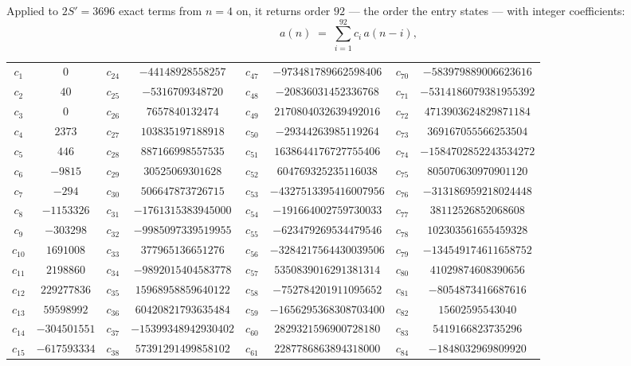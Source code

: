 \documentclass[11pt,a4paper]{article}
\theoremstyle{plain}
\theoremstyle{definition}
\begin{document}
Applied to $2S'=3696$ exact terms from $n=4$ on, it returns order $92$ --- the
order the entry states --- with integer coefficients:
\[
a(n)\;=\;\sum_{i=1}^{92}c_i\,a(n-i),
\]
\begin{center}\small
\begin{tabular}{cccccccc}
$c_{1}$ & $0$ & $c_{24}$ & $-44148928558257$ & $c_{47}$ & $-973481789662598406$ & $c_{70}$ & $-583979889006623616$ \\
$c_{2}$ & $40$ & $c_{25}$ & $-5316709348720$ & $c_{48}$ & $-20836031452336768$ & $c_{71}$ & $-5314186079381955392$ \\
$c_{3}$ & $0$ & $c_{26}$ & $7657840132474$ & $c_{49}$ & $2170804032639492016$ & $c_{72}$ & $4713903624829871184$ \\
$c_{4}$ & $2373$ & $c_{27}$ & $103835197188918$ & $c_{50}$ & $-29344263985119264$ & $c_{73}$ & $369167055566253504$ \\
$c_{5}$ & $446$ & $c_{28}$ & $887166998557535$ & $c_{51}$ & $1638644176727755406$ & $c_{74}$ & $-1584702852243534272$ \\
$c_{6}$ & $-9815$ & $c_{29}$ & $30525069301628$ & $c_{52}$ & $604769325235116038$ & $c_{75}$ & $805070630970901120$ \\
$c_{7}$ & $-294$ & $c_{30}$ & $506647873726715$ & $c_{53}$ & $-4327513395416007956$ & $c_{76}$ & $-313186959218024448$ \\
$c_{8}$ & $-1153326$ & $c_{31}$ & $-1761315383945000$ & $c_{54}$ & $-191664002759730033$ & $c_{77}$ & $38112526852068608$ \\
$c_{9}$ & $-303298$ & $c_{32}$ & $-9985097339519955$ & $c_{55}$ & $-623479269534479546$ & $c_{78}$ & $102303561655459328$ \\
$c_{10}$ & $1691008$ & $c_{33}$ & $377965136651276$ & $c_{56}$ & $-3284217564430039506$ & $c_{79}$ & $-134549174611658752$ \\
$c_{11}$ & $2198860$ & $c_{34}$ & $-9892015404583778$ & $c_{57}$ & $5350839016291381314$ & $c_{80}$ & $41029874608390656$ \\
$c_{12}$ & $229277836$ & $c_{35}$ & $15968958859640122$ & $c_{58}$ & $-752784201911095652$ & $c_{81}$ & $-8054873416687616$ \\
$c_{13}$ & $59598992$ & $c_{36}$ & $60420821793635484$ & $c_{59}$ & $-1656295368308703400$ & $c_{82}$ & $15602595543040$ \\
$c_{14}$ & $-304501551$ & $c_{37}$ & $-15399348942930402$ & $c_{60}$ & $2829321596900728180$ & $c_{83}$ & $5419166823735296$ \\
$c_{15}$ & $-617593334$ & $c_{38}$ & $57391291499858102$ & $c_{61}$ & $2287786863894318000$ & $c_{84}$ & $-1848032969809920$ \\

\end{tabular}
\end{center}
\end{document}
